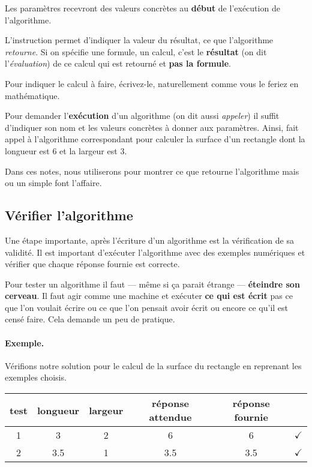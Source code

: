 			Les paramètres recevront des valeurs concrètes
			au \textbf{début} de l’exécution de l’algorithme. 
		
			L’instruction \pc{\algorithmicreturn}
			permet d’indiquer la valeur du résultat, 
			ce que l’algorithme \emph{retourne}.
			Si on spécifie une formule, un calcul,
			c’est le \textbf{résultat} (on dit l’\emph{évaluation}) 
			de ce calcul qui est retourné et \textbf{pas la formule}.
		
			Pour indiquer le calcul à faire, écrivez-le, naturellement comme
			vous le feriez en mathématique.  
	
			Pour demander l'\textbf{exécution} d'un algorithme (on dit aussi
			\emph{appeler}) il suffit d’indiquer son nom et les valeurs
			concrètes à donner aux paramètres.  Ainsi,
			 fait appel à l’algorithme correspondant
			pour calculer la surface d’un rectangle dont la longueur est $6$ et
			la largeur est $3$.

			Dans ces notes, nous utiliserons \pc{$\rightarrow$} pour montrer ce
			que retourne l'algorithme mais \pc{:} ou un simple 
			\pc{\large\textvisiblespace}
			font l'affaire.

		\subsection{Vérifier l’algorithme}
	
			Une étape importante, après l'écriture d'un algorithme est la
			vérification de sa validité. Il est important d'exécuter
			l’algorithme avec des exemples numériques et vérifier que chaque 
			réponse fournie est correcte.

			Pour tester un algorithme il faut — même si ça parait étrange
			— \textbf{éteindre son cerveau}.  Il faut agir comme une machine et
			exécuter \textbf{ce qui est écrit} pas ce que l'on voulait écrire ou
			ce que l'on pensait avoir écrit ou encore ce qu’il est censé faire.
			Cela demande un peu de pratique.

			\paragraph{Exemple.} 
			Vérifions notre solution 
			pour le calcul de la surface du rectangle
			en reprenant les exemples choisis.
			
			\begin{center}
			\begin{tabular}{|c|cccc|c|}
			\hline
			\rowcolor{black!40}
			test \no & longueur & largeur & réponse attendue 
				& réponse fournie & {} \\
			\hline 
			1 & 3   & 2 & 6   & 6   & {\color{ForestGreen}$\checkmark$} \\\hline
			2 & 3.5 & 1 & 3.5 & 3.5 & {\color{ForestGreen}$\checkmark$} \\\hline
			\end{tabular}
			\end{center}				
		

